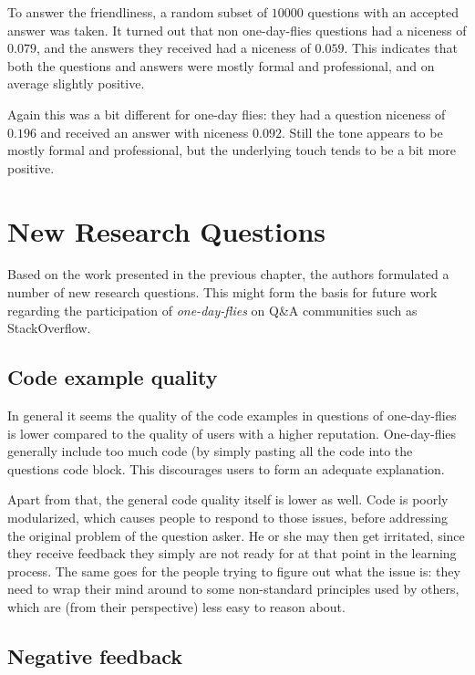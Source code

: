 \documentclass[conference]{IEEEtran}
\begin{document}
To answer the friendliness, a random subset of $10000$ questions with an
accepted answer was taken. It turned out that non one-day-flies questions had a
niceness of $0.079$, and the answers they received had a niceness of $0.059$.
This indicates that both the questions and answers were mostly formal and
professional, and on average slightly positive.

Again this was a bit different for one-day flies: they had a question niceness
of $0.196$ and received an answer with niceness $0.092$. Still the tone appears
to be mostly formal and professional, but the underlying touch tends to be a
bit more positive.

\section{New Research Questions} \label{NewResearchQuestions}

Based on the work presented in the previous chapter, the authors formulated a
number of new research questions. This might form the basis for future work
regarding the participation of \textit{one-day-flies} on Q\&A communities such
as StackOverflow.

\subsection{Code example quality}

In general it seems the quality of the code examples in questions of
one-day-flies is lower compared to the quality of users with a higher
reputation. One-day-flies generally include too much code (by simply pasting
all the code into the questions code block. This discourages users to form an
adequate explanation.

Apart from that, the general code quality itself is lower as well. Code is
poorly modularized, which causes people to respond to those issues, before
addressing the original problem of the question asker. He or she may then get
irritated, since they receive feedback they simply are not ready for at that
point in the learning process. The same goes for the people trying to figure
out what the issue is: they need to wrap their mind around to some non-standard
principles used by others, which are (from their perspective) less easy to
reason about.

\subsection{Negative feedback}
\end{document}
